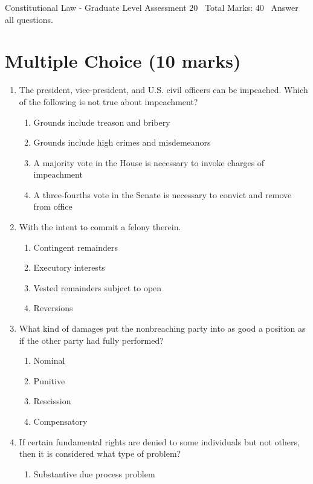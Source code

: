 \documentclass[12pt]{article}
\begin{document}
\begin{center}
Constitutional Law - Graduate Level Assessment 20 \
Total Marks: 40 \
Answer all questions.
\end{center}

\section*{Multiple Choice (10 marks)}
\begin{enumerate}[label=\arabic*.]
\item The president, vice-president, and U.S. civil officers can be impeached. Which of the following is not true about impeachment?
\begin{enumerate}[label=(\alph*)]
    \item Grounds include treason and bribery
    \item Grounds include high crimes and misdemeanors
    \item A majority vote in the House is necessary to invoke charges of impeachment
    \item A three-fourths vote in the Senate is necessary to convict and remove from office
\end{enumerate}
\item With the intent to commit a felony therein.
\begin{enumerate}[label=(\alph*)]
    \item Contingent remainders
    \item Executory interests
    \item Vested remainders subject to open
    \item Reversions
\end{enumerate}
\item What kind of damages put the nonbreaching party into as good a position as if the other party had fully performed?
\begin{enumerate}[label=(\alph*)]
    \item Nominal
    \item Punitive
    \item Rescission
    \item Compensatory
\end{enumerate}
\item If certain fundamental rights are denied to some individuals but not others, then it is considered what type of problem?
\begin{enumerate}[label=(\alph*)]
    \item Substantive due process problem

\end{enumerate}
\end{enumerate}
\end{document}
